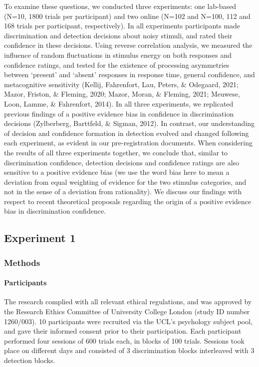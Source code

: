 \documentclass[
  english,
  man]{apa6}
\let\oldparagraph\paragraph
\renewcommand{\paragraph}[1]{\oldparagraph{#1}\mbox{}}
\begin{document}
To examine these questions, we conducted three experiments: one lab-based (N=10, 1800 trials per participant) and two online (N=102 and N=100, 112 and 168 trials per participant, respectively). In all experiments participants made discrimination and detection decisions about noisy stimuli, and rated their confidence in these decisions. Using reverse correlation analysis, we measured the influence of random fluctuations in stimulus energy on both responses and confidence ratings, and tested for the existence of processing asymmetries between `present' and `absent' responses in response time, general confidence, and metacognitive sensitivity (Kellij, Fahrenfort, Lau, Peters, \& Odegaard, 2021; Mazor, Friston, \& Fleming, 2020; Mazor, Moran, \& Fleming, 2021; Meuwese, Loon, Lamme, \& Fahrenfort, 2014). In all three experiments, we replicated previous findings of a positive evidence bias in confidence in discrimination decisions (Zylberberg, Barttfeld, \& Sigman, 2012). In contrast, our understanding of decision and confidence formation in detection evolved and changed following each experiment, as evident in our pre-registration documents. When considering the results of all three experiments together, we conclude that, similar to discrimination confidence, detection decisions and confidence ratings are also sensitive to a positive evidence bias (we use the word bias here to mean a deviation from equal weighting of evidence for the two stimulus categories, and not in the sense of a deviation from rationality). We discuss our findings with respect to recent theoretical proposals regarding the origin of a positive evidence bias in discrimination confidence.

\hypertarget{experiment-1}{%
\subsection{Experiment 1}\label{experiment-1}}

\hypertarget{methods}{%
\subsubsection{Methods}\label{methods}}

\hypertarget{participants}{%
\paragraph{Participants}\label{participants}}

The research complied with all relevant ethical regulations, and was approved by the Research Ethics Committee of University College London (study ID number 1260/003). 10 participants were recruited via the UCL's psychology subject pool, and gave their informed consent prior to their participation. Each participant performed four sessions of 600 trials each, in blocks of 100 trials. Sessions took place on different days and consisted of 3 discrimination blocks interleaved with 3 detection blocks.
\end{document}
